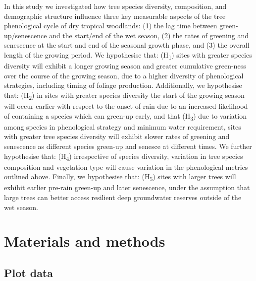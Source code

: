 \begin{refsection}
In this study we investigated how tree species diversity, composition, and demographic structure influence three key measurable aspects of the tree phenological cycle of dry tropical woodlands: (1) the lag time between green-up/senescence and the start/end of the wet season, (2) the rates of greening and senescence at the start and end of the seasonal growth phase, and (3) the overall length of the growing period. We hypothesise that: (H\textsubscript{1}) sites with greater species diversity will exhibit a longer growing season and greater cumulative green-ness over the course of the growing season, due to a higher diversity of phenological strategies, including timing of foliage production. Additionally, we hypothesise that: (H\textsubscript{2}) in sites with greater species diversity the start of the growing season will occur earlier with respect to the onset of rain due to an increased likelihood of containing a species which can green-up early, and that (H\textsubscript{3}) due to variation among species in phenological strategy and minimum water requirement, sites with greater tree species diversity will exhibit slower rates of greening and senescence as different species green-up and senesce at different times. We further hypothesise that: (H\textsubscript{4}) irrespective of species diversity, variation in tree species composition and vegetation type will cause variation in the phenological metrics outlined above. Finally, we hypothesise that: (H\textsubscript{5}) sites with larger trees will exhibit earlier pre-rain green-up and later senescence, under the assumption that large trees can better access resilient deep groundwater reserves outside of the wet season.

\section{Materials and methods}
\label{phen:sec:methods}

\subsection{Plot data}
\label{phen:ssec:plots}


\end{refsection}
